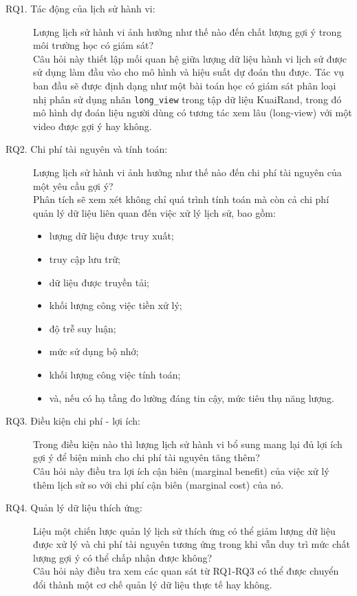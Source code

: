 \documentclass[12pt,a4paper]{article}
\begin{document}
\begin{description}
    \item[RQ1. Tác động của lịch sử hành vi:] Lượng lịch sử hành vi ảnh hưởng như thế nào đến chất lượng gợi ý trong môi trường học có giám sát?\\
    Câu hỏi này thiết lập mối quan hệ giữa lượng dữ liệu hành vi lịch sử được sử dụng làm đầu vào cho mô hình và hiệu suất dự đoán thu được. Tác vụ ban đầu sẽ được định dạng như một bài toán học có giám sát phân loại nhị phân sử dụng nhãn \texttt{long\_view} trong tập dữ liệu KuaiRand, trong đó mô hình dự đoán liệu người dùng có tương tác xem lâu (long-view) với một video được gợi ý hay không.

    \item[RQ2. Chi phí tài nguyên và tính toán:] Lượng lịch sử hành vi ảnh hưởng như thế nào đến chi phí tài nguyên của một yêu cầu gợi ý?\\
    Phân tích sẽ xem xét không chỉ quá trình tính toán mà còn cả chi phí quản lý dữ liệu liên quan đến việc xử lý lịch sử, bao gồm:
    \begin{itemize}
        \item lượng dữ liệu được truy xuất;
        \item truy cập lưu trữ;
        \item dữ liệu được truyền tải;
        \item khối lượng công việc tiền xử lý;
        \item độ trễ suy luận;
        \item mức sử dụng bộ nhớ;
        \item khối lượng công việc tính toán;
        \item và, nếu có hạ tầng đo lường đáng tin cậy, mức tiêu thụ năng lượng.
    \end{itemize}

    \item[RQ3. Điều kiện chi phí - lợi ích:] Trong điều kiện nào thì lượng lịch sử hành vi bổ sung mang lại đủ lợi ích gợi ý để biện minh cho chi phí tài nguyên tăng thêm?\\
    Câu hỏi này điều tra lợi ích cận biên (marginal benefit) của việc xử lý thêm lịch sử so với chi phí cận biên (marginal cost) của nó.

    \item[RQ4. Quản lý dữ liệu thích ứng:] Liệu một chiến lược quản lý lịch sử thích ứng có thể giảm lượng dữ liệu được xử lý và chi phí tài nguyên tương ứng trong khi vẫn duy trì mức chất lượng gợi ý có thể chấp nhận được không?\\
    Câu hỏi này điều tra xem các quan sát từ RQ1-RQ3 có thể được chuyển đổi thành một cơ chế quản lý dữ liệu thực tế hay không.
\end{description}
\end{document}
